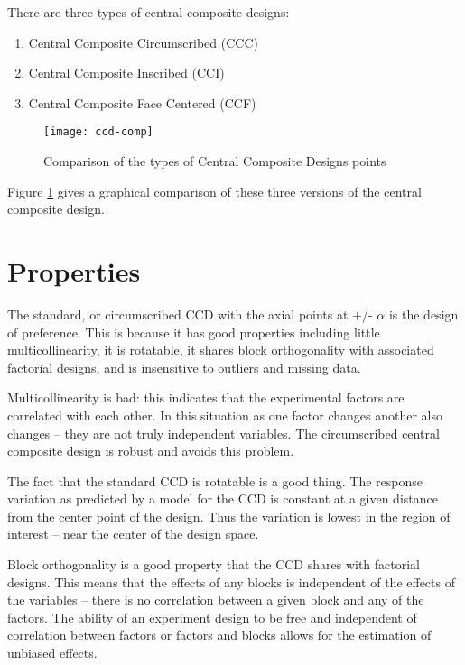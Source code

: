 There are three types of central composite designs:

\begin{enumerate}
\item Central Composite Circumscribed (CCC)

\item Central Composite Inscribed (CCI)

\item Central Composite Face Centered (CCF)
\end{enumerate}

\begin{figure}[h]\caption{Comparison of the types of Central Composite Designs points}\label{comp}
\begin{center}
\texttt{[image: ccd-comp]}
\end{center}
\end{figure}
Figure \ref{comp} gives a graphical comparison of these three versions of the central composite design.

\section{Properties}
The standard, or circumscribed CCD with the axial points at +/- $\alpha$ is the design of preference. This is because it has good properties including little multicollinearity, it is rotatable, it shares block orthogonality with associated factorial designs, and is insensitive to outliers and missing data. 

Multicollinearity is bad: this indicates that the experimental factors are correlated with each other. In this situation as one factor changes another also changes -- they are not truly independent variables. The circumscribed central composite design is robust and avoids this problem.

The fact that the standard CCD is rotatable is a good thing. The response variation as predicted by a model for the CCD is constant at a given distance from the center point of the design. Thus the variation is lowest in the region of interest -- near the center of the design space.

Block orthogonality is a good property that the CCD shares with factorial designs. This means that the effects of any blocks is independent of the effects of the variables -- there is no correlation between a given block and any of the factors. The ability of an experiment design to be free and independent of correlation between factors or factors and blocks allows for the estimation of unbiased effects.

